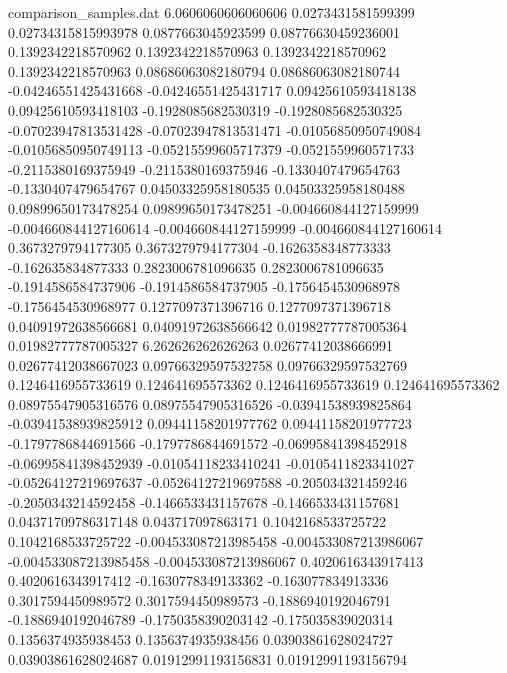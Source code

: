 \begin{filecontents}{comparison_samples.dat}
6.0606060606060606  0.0273431581599399      0.02734315815993978     0.0877663045923599     0.08776630459236001    0.1392342218570962     0.1392342218570963     0.1392342218570962     0.1392342218570963     0.08686063082180794    0.08686063082180744    -0.04246551425431668    -0.04246551425431717    0.09425610593418138    0.09425610593418103    -0.1928085682530319     -0.1928085682530325     -0.07023947813531428    -0.07023947813531471    -0.01056850950749084    -0.01056850950749113    -0.05215599605717379    -0.0521559960571733     -0.2115380169375949     -0.2115380169375946     -0.1330407479654763     -0.1330407479654767     0.04503325958180535    0.04503325958180488    0.09899650173478254    0.09899650173478251    -0.004660844127159999   -0.004660844127160614   -0.004660844127159999   -0.004660844127160614   0.3673279794177305     0.3673279794177304     -0.1626358348773333     -0.162635834877333      0.2823006781096635     0.2823006781096635     -0.1914586584737906     -0.1914586584737905     -0.1756454530968978     -0.1756454530968977     0.1277097371396716     0.1277097371396718     0.04091972638566681    0.04091972638566642    0.01982777787005364     0.01982777787005327   
6.262626262626263   0.02677412038666991     0.02677412038667023     0.09766329597532758    0.09766329597532769    0.1246416955733619     0.124641695573362      0.1246416955733619     0.124641695573362      0.08975547905316576    0.08975547905316526    -0.03941538939825864    -0.03941538939825912    0.09441158201977762    0.09441158201977723    -0.1797786844691566     -0.1797786844691572     -0.06995841398452918    -0.06995841398452939    -0.01054118233410241    -0.0105411823341027     -0.05264127219697637    -0.05264127219697588    -0.205034321459246      -0.2050343214592458     -0.1466533431157678     -0.1466533431157681     0.04371709786317148    0.043717097863171      0.1042168533725722     0.1042168533725722     -0.004533087213985458   -0.004533087213986067   -0.004533087213985458   -0.004533087213986067   0.4020616343917413     0.4020616343917412     -0.1630778349133362     -0.163077834913336      0.3017594450989572     0.3017594450989573     -0.1886940192046791     -0.1886940192046789     -0.1750358390203142     -0.175035839020314      0.1356374935938453     0.1356374935938456     0.03903861628024727    0.03903861628024687    0.01912991193156831     0.01912991193156794   

\end{filecontents}
